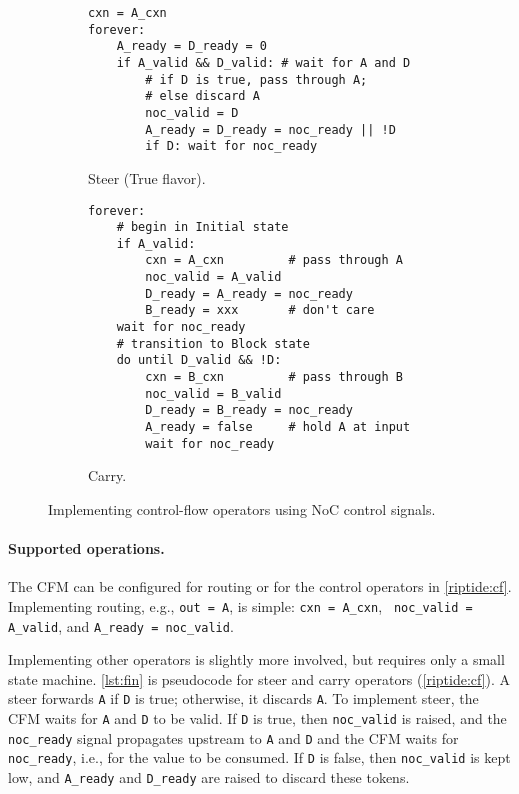 \begin{figure}[t]
\begin{subfigure}{\linewidth}
\begin{lstlisting}[style=custompython]
cxn = A_cxn
forever:
    A_ready = D_ready = 0
    if A_valid && D_valid: # wait for A and D
        # if D is true, pass through A;
        # else discard A 
        noc_valid = D
        A_ready = D_ready = noc_ready || !D
        if D: wait for noc_ready
\end{lstlisting}
\caption{Steer (True flavor).}
\label{lst:fin:steer}
\end{subfigure}

\begin{subfigure}{\linewidth}
\begin{lstlisting}[style=custompython]
forever:
    # begin in Initial state
    if A_valid:
        cxn = A_cxn         # pass through A
        noc_valid = A_valid
        D_ready = A_ready = noc_ready
        B_ready = xxx       # don't care
    wait for noc_ready
    # transition to Block state
    do until D_valid && !D:
        cxn = B_cxn         # pass through B
        noc_valid = B_valid
        D_ready = B_ready = noc_ready
        A_ready = false     # hold A at input
        wait for noc_ready
\end{lstlisting}
\caption{Carry.}
\label{lst:fin:carry}
\end{subfigure}
  \caption{Implementing control-flow operators using NoC control
    signals.}
  \label{lst:fin}
\end{figure}

\paragraph{Supported operations.}
The CFM can be configured for routing or for the control operators in
\autoref{riptide:cf}.
%
Implementing routing, e.g., {\tt out = A}, is simple: {\tt cxn = A\_cxn}, {\tt
noc\_valid = A\_valid}, and {\tt A\_ready = noc\_valid}.

Implementing other operators is slightly more involved, but requires only a
small state machine.
%
\autoref{lst:fin} is pseudocode for steer and carry operators
(\autoref{riptide:cf}).
%
A steer forwards {\tt A} if {\tt D} is true; otherwise,
it discards {\tt A}.
%
To implement steer, the CFM waits for {\tt A} and {\tt D}
to be valid.
%
If {\tt D} is true, then {\tt noc\_valid} is raised, and the {\tt
  noc\_ready} signal propagates upstream to {\tt A} and {\tt D}
and the CFM waits for {\tt noc\_ready}, i.e., for the value to be consumed.
%
If {\tt D} is false, then {\tt noc\_valid} is kept low, and
{\tt A\_ready} and {\tt D\_ready} are raised to discard these
tokens.

